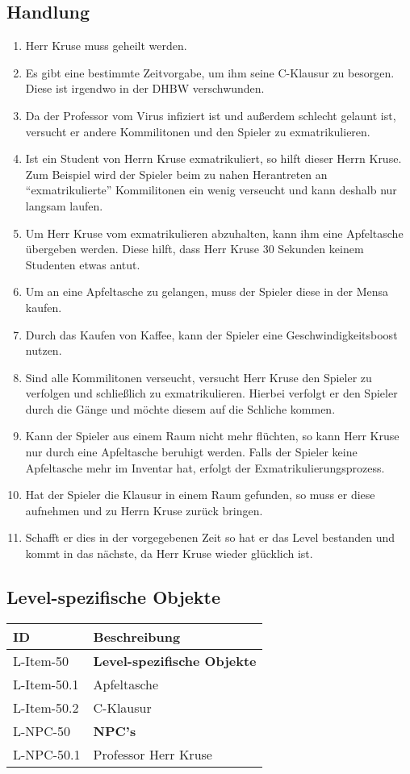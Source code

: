 \subsection{Handlung}
\begin{enumerate}
\item Herr Kruse muss geheilt werden. 
\item Es gibt eine bestimmte Zeitvorgabe, um ihm seine C-Klausur zu besorgen. Diese ist irgendwo in der DHBW verschwunden.
\item Da der Professor vom Virus infiziert ist und außerdem schlecht gelaunt ist, versucht er andere Kommilitonen und den Spieler zu exmatrikulieren.
\item Ist ein Student von Herrn Kruse exmatrikuliert, so hilft dieser Herrn Kruse. Zum Beispiel wird der Spieler beim zu nahen Herantreten an \enquote{exmatrikulierte} Kommilitonen ein wenig verseucht und kann deshalb nur langsam laufen.
\item Um Herr Kruse vom exmatrikulieren abzuhalten, kann ihm eine Apfeltasche übergeben werden. Diese hilft, dass Herr Kruse 30 Sekunden keinem Studenten etwas antut.
\item Um an eine Apfeltasche zu gelangen, muss der Spieler diese in der Mensa kaufen. 
\item Durch das Kaufen von Kaffee, kann der Spieler eine Geschwindigkeitsboost nutzen. 
\item Sind alle Kommilitonen verseucht, versucht Herr Kruse den Spieler zu verfolgen und schließlich zu exmatrikulieren. Hierbei verfolgt er den Spieler durch die Gänge und möchte diesem auf die Schliche kommen. 
\item Kann der Spieler aus einem Raum nicht mehr flüchten, so kann Herr Kruse nur durch eine Apfeltasche beruhigt werden. Falls der Spieler keine Apfeltasche mehr im Inventar hat, erfolgt der Exmatrikulierungsprozess.
\item Hat der Spieler die Klausur in einem Raum gefunden, so muss er diese aufnehmen und zu Herrn Kruse zurück bringen.
\item Schafft er dies in der vorgegebenen Zeit so hat er das Level bestanden und kommt in das nächste, da Herr Kruse wieder glücklich ist.

\end{enumerate}

\subsection{Level-spezifische Objekte}
\begin{tabularx}{\textwidth}{|l|l|}
\toprule
\textbf{ID} & \textbf{Beschreibung}\\
\endhead
\hline
L-Item-50 & \textbf{Level-spezifische Objekte} \\
L-Item-50.1 & Apfeltasche  \\
L-Item-50.2 & C-Klausur  \\
\hline
L-NPC-50 & \textbf{NPC's} \\
L-NPC-50.1 & Professor Herr Kruse \\
\hline
\end{tabularx}

